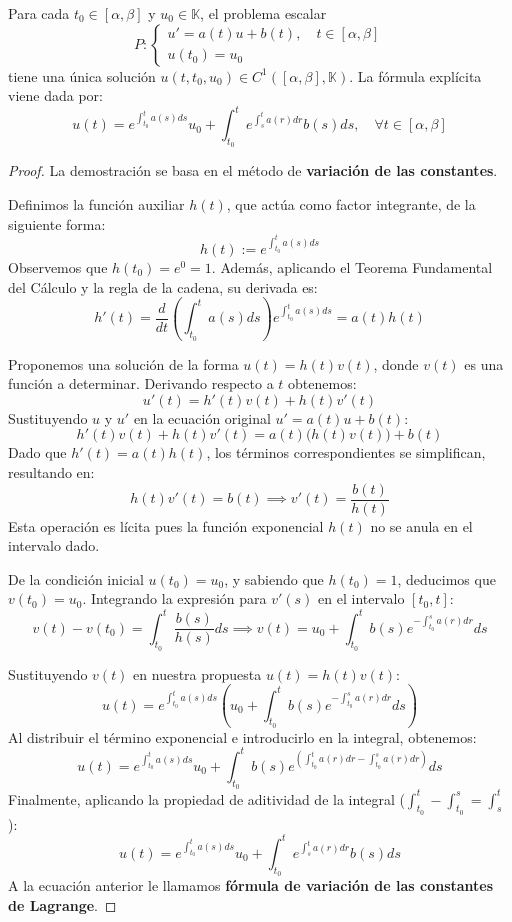 \begin{teorema} [Resolución del sistema lineal escalar, caso $n=1$]
    Para cada $t_0 \in [\alpha, \beta]$ y $u_0 \in \mathbb{K}$, el problema escalar
    \[
        P : \begin{cases}
            u' = a(t) u + b(t), \quad t \in [\alpha, \beta] \\
            u(t_0) = u_0
        \end{cases}
    \]
    tiene una única solución $u(t,t_0,u_0) \in C^{1}([\alpha, \beta], \mathbb{K})$. La fórmula explícita viene dada por:
    \[
        u(t) = e^{\int_{t_0}^{t} a(s) ds} u_0 + \int_{t_0}^{t} e^{\int_{s}^{t} a(r) dr} b(s) ds, \quad \forall t \in [\alpha, \beta]
    \]
\end{teorema}

\begin{proof}
    La demostración se basa en el método de \textbf{variación de las constantes}.

    Definimos la función auxiliar $h(t)$, que actúa como factor integrante, de la siguiente forma:
    \[
        h(t) := e^{\int_{t_0}^{t} a(s) ds}
    \]
    Observemos que $h(t_0) = e^0 = 1$. Además, aplicando el Teorema Fundamental del Cálculo y la regla de la cadena, su derivada es:
    \[
        h'(t) = \frac{d}{dt} \left( \int_{t_0}^{t} a(s) ds \right) e^{\int_{t_0}^{t} a(s) ds} = a(t) h(t)
    \]
    
    Proponemos una solución de la forma $u(t) = h(t)v(t)$, donde $v(t)$ es una función a determinar. Derivando respecto a $t$ obtenemos:
    \[
        u'(t) = h'(t)v(t) + h(t)v'(t)
    \]
    Sustituyendo $u$ y $u'$ en la ecuación original $u' = a(t)u + b(t)$:
    \[
        h'(t)v(t) + h(t)v'(t) = a(t) \big( h(t)v(t) \big) + b(t)
    \]
    Dado que $h'(t) = a(t)h(t)$, los términos correspondientes se simplifican, resultando en:
    \[
        h(t)v'(t) = b(t) \implies v'(t) = \frac{b(t)}{h(t)}
    \]
    Esta operación es lícita pues la función exponencial $h(t)$ no se anula en el intervalo dado.
    
    De la condición inicial $u(t_0) = u_0$, y sabiendo que $h(t_0) = 1$, deducimos que $v(t_0) = u_0$. Integrando la expresión para $v'(s)$ en el intervalo $[t_0, t]$:
    \[
        v(t) - v(t_0) = \int_{t_0}^{t} \frac{b(s)}{h(s)} ds \implies v(t) = u_0 + \int_{t_0}^{t} b(s) e^{-\int_{t_0}^{s} a(r) dr} ds
    \]
    
    Sustituyendo $v(t)$ en nuestra propuesta $u(t) = h(t)v(t)$:
    \[
        u(t) = e^{\int_{t_0}^{t} a(s) ds} \left( u_0 + \int_{t_0}^{t} b(s) e^{-\int_{t_0}^{s} a(r) dr} ds \right)
    \]
    Al distribuir el término exponencial e introducirlo en la integral, obtenemos:
    \[
        u(t) = e^{\int_{t_0}^{t} a(s) ds} u_0 + \int_{t_0}^{t} b(s) e^{\left( \int_{t_0}^{t} a(r) dr - \int_{t_0}^{s} a(r) dr \right)} ds
    \]
    Finalmente, aplicando la propiedad de aditividad de la integral ($\int_{t_0}^{t} - \int_{t_0}^{s} = \int_{s}^{t}$):
    \[
        u(t) = e^{\int_{t_0}^{t} a(s) ds} u_0 + \int_{t_0}^{t} e^{\int_{s}^{t} a(r) dr} b(s) ds
    \]
    A la ecuación anterior le llamamos \textbf{fórmula de variación de las constantes de Lagrange}.
\end{proof}

